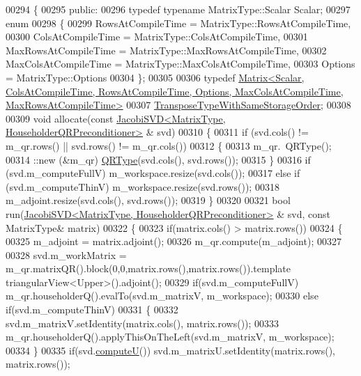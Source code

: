 \begin{DoxyCode}
00294 \{
00295 \textcolor{keyword}{public}:
00296   \textcolor{keyword}{typedef} \textcolor{keyword}{typename} MatrixType::Scalar Scalar;
00297   \textcolor{keyword}{enum}
00298   \{
00299     RowsAtCompileTime = MatrixType::RowsAtCompileTime,
00300     ColsAtCompileTime = MatrixType::ColsAtCompileTime,
00301     MaxRowsAtCompileTime = MatrixType::MaxRowsAtCompileTime,
00302     MaxColsAtCompileTime = MatrixType::MaxColsAtCompileTime,
00303     Options = MatrixType::Options
00304   \};
00305 
00306   \textcolor{keyword}{typedef} 
      \hyperlink{group___core___module}{Matrix<Scalar, ColsAtCompileTime, RowsAtCompileTime, Options, MaxColsAtCompileTime, MaxRowsAtCompileTime>}
00307           \hyperlink{group___core___module}{TransposeTypeWithSameStorageOrder};
00308 
00309   \textcolor{keywordtype}{void} allocate(\textcolor{keyword}{const} \hyperlink{group___s_v_d___module_class_eigen_1_1_jacobi_s_v_d}{JacobiSVD<MatrixType, HouseholderQRPreconditioner>}
      & svd)
00310   \{
00311     \textcolor{keywordflow}{if} (svd.cols() != m\_qr.rows() || svd.rows() != m\_qr.cols())
00312     \{
00313       m\_qr.~QRType();
00314       ::new (&m\_qr) \hyperlink{group___q_r___module}{QRType}(svd.cols(), svd.rows());
00315     \}
00316     \textcolor{keywordflow}{if} (svd.m\_computeFullV) m\_workspace.resize(svd.cols());
00317     \textcolor{keywordflow}{else} \textcolor{keywordflow}{if} (svd.m\_computeThinV) m\_workspace.resize(svd.rows());
00318     m\_adjoint.resize(svd.cols(), svd.rows());
00319   \}
00320 
00321   \textcolor{keywordtype}{bool} run(\hyperlink{group___s_v_d___module_class_eigen_1_1_jacobi_s_v_d}{JacobiSVD<MatrixType, HouseholderQRPreconditioner>}
      & svd, \textcolor{keyword}{const} MatrixType& matrix)
00322   \{
00323     \textcolor{keywordflow}{if}(matrix.cols() > matrix.rows())
00324     \{
00325       m\_adjoint = matrix.adjoint();
00326       m\_qr.compute(m\_adjoint);
00327 
00328       svd.m\_workMatrix = m\_qr.matrixQR().block(0,0,matrix.rows(),matrix.rows()).\textcolor{keyword}{template} 
      triangularView<Upper>().adjoint();
00329       \textcolor{keywordflow}{if}(svd.m\_computeFullV) m\_qr.householderQ().evalTo(svd.m\_matrixV, m\_workspace);
00330       \textcolor{keywordflow}{else} \textcolor{keywordflow}{if}(svd.m\_computeThinV)
00331       \{
00332         svd.m\_matrixV.setIdentity(matrix.cols(), matrix.rows());
00333         m\_qr.householderQ().applyThisOnTheLeft(svd.m\_matrixV, m\_workspace);
00334       \}
00335       \textcolor{keywordflow}{if}(svd.\hyperlink{group___s_v_d___module_a705a7c2709e1624ccc19aa748a78d473}{computeU}()) svd.m\_matrixU.setIdentity(matrix.rows(), matrix.rows());

\end{DoxyCode}
